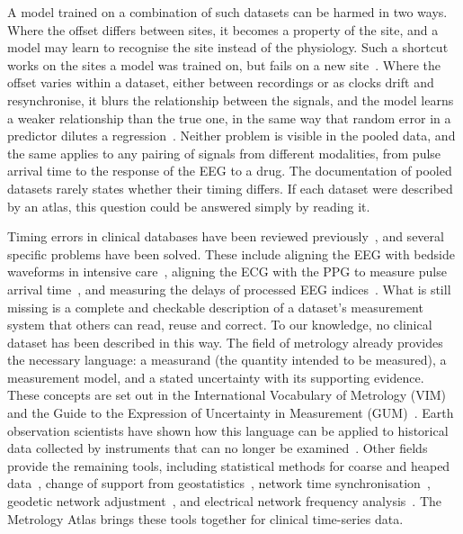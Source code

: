 \documentclass[11pt,a4paper]{article}
\begin{document}
A model trained on a combination of such datasets can be harmed in two ways. Where the offset differs between sites,
it becomes a property of the site, and a model may learn to recognise the site instead of the physiology. Such a
shortcut works on the sites a model was trained on, but fails on a new
site~\citep{geirhos2020shortcut,zech2018variable}. Where the offset varies within a dataset, either between recordings
or as clocks drift and resynchronise, it blurs the relationship between the signals, and the model learns a weaker
relationship than the true one, in the same way that random error in a predictor dilutes a
regression~\citep{hutcheon2010random}. Neither problem is visible in the pooled data, and the same applies to any
pairing of signals from different modalities, from pulse arrival time to the response of the EEG to a drug. The
documentation of pooled datasets rarely states whether their timing differs. If each dataset were described by an
atlas, this question could be answered simply by reading it.

Timing errors in clinical databases have been reviewed previously~\citep{goodwin2022timing}, and several specific
problems have been solved. These include aligning the EEG with bedside waveforms in intensive
care~\citep{goodwin2023}, aligning the ECG with the PPG to measure pulse arrival time~\citep{ruffolo2025high}, and
measuring the delays of processed EEG indices~\citep{pilge2006timedelay}. What is still missing is a complete and checkable
description of a dataset's measurement system that others can read, reuse and correct. To our knowledge, no clinical
dataset has been described in this way. The field of metrology already provides the necessary language: a measurand
(the quantity intended to be measured), a measurement model, and a stated uncertainty with its supporting evidence.
These concepts are set out in the International Vocabulary of Metrology (VIM)~\citep{jcgm-200-2012} and the Guide to
the Expression of Uncertainty in Measurement (GUM)~\citep{jcgm-100-2008}. Earth
observation scientists have shown how this language can be applied to historical data collected by instruments that
can no longer be examined~\citep{mittaz2019metrology}. Other fields provide the remaining tools, including statistical
methods for coarse and heaped data~\citep{heitjan1989grouped,heitjan1991coarse,wang2008heaping}, change of support
from geostatistics~\citep{gotway2002combining}, network time synchronisation~\citep{rfc5905}, geodetic network
adjustment~\citep{ghilani2017adjustment}, and electrical network frequency analysis~\citep{grigoras2005enf}. The
Metrology Atlas brings these tools together for clinical time-series data.
\end{document}
